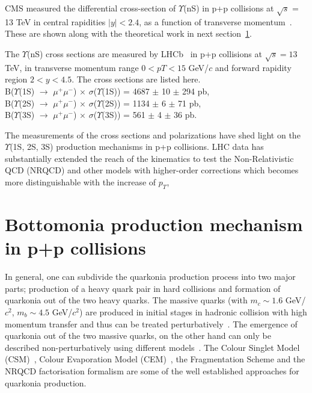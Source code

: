 CMS measured the differential cross-section of $\Upsilon$(nS)
in p+p collisions at $\sqrt{s}$ = 13 TeV in central rapidities $|y|<2.4$,
as a function of transverse momentum~\cite{Sirunyan:2017qdw}. These are
shown along with the theoretical work in next section~\ref{sec:Bottomonia_pp_th}.

The $\Upsilon$(nS) cross sections are measured by LHCb~\cite{LHCb:2018yzj}
in p+p collisions at $\sqrt{s}=13$ TeV, in transverse momentum
range $0 < pT < 15$ GeV/$c$ and forward rapidity region $2 < y < 4.5$.
The cross sections are listed here. \\
B($\Upsilon$(1S) $\rightarrow$ $\mu^+\mu^-$) $\times$ $\sigma$($\Upsilon$(1S)) = 4687 $\pm$ 10 $\pm$ 294 pb,\\
B($\Upsilon$(2S) $\rightarrow$ $\mu^+\mu^-$) $\times$ $\sigma$($\Upsilon$(2S)) = 1134 $\pm$ 6 $\pm$ 71 pb, \\
B($\Upsilon$(3S) $\rightarrow$ $\mu^+\mu^-$) $\times$ $\sigma$($\Upsilon$(3S)) = 561 $\pm$ 4 $\pm$ 36 pb. 


The measurements of the cross sections and polarizations have shed light on the
$\Upsilon$(1S, 2S, 3S) production mechanisms in p+p collisions.
LHC data has substantially extended the reach of the kinematics to test the
Non-Relativistic QCD (NRQCD) and other models with
higher-order corrections which becomes more
distinguishable with the increase of $p_{T}$,






\section{Bottomonia production mechanism in p+p collisions}
\label{sec:Bottomonia_pp_th}


In general, one can subdivide the quarkonia production process into two major parts;
production of a heavy quark pair in hard collisions and formation of quarkonia
out of the two heavy quarks.
  The massive quarks (with $m_c\sim 1.6$ GeV/$c^2$, $m_b\sim 4.5$ GeV/$c^2$) are produced
in initial stages in hadronic collision with high momentum transfer and thus
can be treated perturbatively~\cite{Nason:1989zy}. The emergence of quarkonia
out of the two massive quarks, on the other hand can only be described non-perturbatively using different
models~\cite{Bodwin:1994jh,Brambilla:2014jmp}.
The Colour Singlet Model (CSM)~\cite{Einhorn:1975ua,Berger:1980ni},
Colour Evaporation Model (CEM)~\cite{Fritzsch:1977ay,Amundson:1995em}, the Fragmentation Scheme and 
the NRQCD factorisation formalism are some of the well established approaches for quarkonia production.


